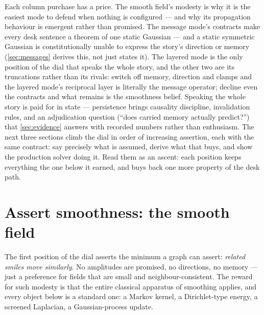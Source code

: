 \documentclass[11pt]{article}
\begin{document}
Each column purchase has a price.  The smooth field's modesty is why it is
the easiest mode to defend when nothing is configured --- and why its
propagation behaviour is emergent rather than promised.  The message mode's
contracts make every desk sentence a theorem of one static Gaussian --- and
a static symmetric Gaussian is constitutionally unable to express the
story's direction or memory (\cref{sec:messages} derives this, not just
states it).  The layered mode is the only position of the dial that speaks
the whole story, and the other two are its truncations rather than its
rivals: switch off memory, direction and clamps and the layered mode's
reciprocal layer is literally the message operator; decline even the
contracts and what remains is the smoothness belief.  Speaking the whole
story is paid for in state --- persistence brings causality discipline,
invalidation rules, and an adjudication question (``does carried memory
actually predict?'') that \cref{sec:evidence} answers with recorded
numbers rather than enthusiasm.  The next three sections climb the dial in
order of increasing assertion, each with the same contract: say precisely
what is assumed, derive what that buys, and show the production solver
doing it.  Read them as an ascent: each position keeps everything the one
below it earned, and buys back one more property of the desk path.

\section{Assert smoothness: the smooth field}
\label{sec:smooth}

The first position of the dial asserts the minimum a graph can assert:
\emph{related smiles move similarly}.  No amplitudes are promised, no
directions, no memory --- just a preference for fields that are small and
neighbour-consistent.  The reward for such modesty is that the entire
classical apparatus of smoothing applies, and every object below is a
standard one: a Markov kernel, a Dirichlet-type energy, a screened
Laplacian, a Gaussian-process update.
\end{document}
